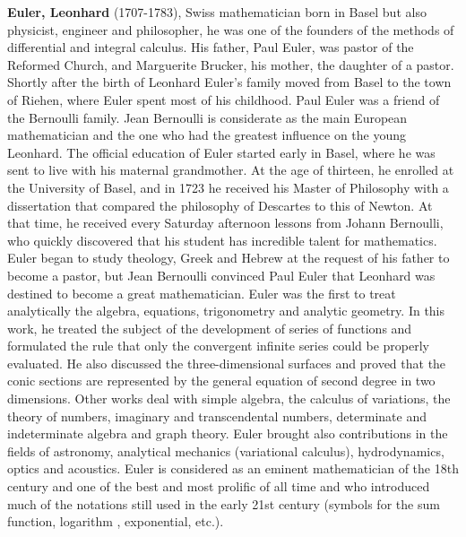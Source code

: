 \textbf{Euler, Leonhard} (1707-1783), Swiss mathematician born in Basel but also physicist, engineer and philosopher, he was one of the founders of the methods of differential and integral calculus.  His father, Paul Euler, was pastor of the Reformed Church, and Marguerite Brucker, his mother, the daughter of a pastor. Shortly after the birth of Leonhard Euler's family moved from Basel to the town of Riehen, where Euler spent most of his childhood. Paul Euler was a friend of the Bernoulli family. Jean Bernoulli is considerate as the main European mathematician and the one who had the greatest influence on the young Leonhard. The official education of Euler started early in Basel, where he was sent to live with his maternal grandmother. At the age of thirteen, he enrolled at the University of Basel, and in 1723 he received his Master of Philosophy with a dissertation that compared the philosophy of Descartes to this of Newton. At that time, he received every Saturday afternoon lessons from Johann Bernoulli, who quickly discovered that his student has incredible talent for mathematics. Euler began to study theology, Greek and Hebrew at the request of his father to become a pastor, but Jean Bernoulli convinced Paul Euler that Leonhard was destined to become a great mathematician. Euler was the first to treat analytically the algebra, equations, trigonometry and analytic geometry. In this work, he treated the subject of the development of series of functions and formulated the rule that only the convergent infinite series could be properly evaluated. He also discussed the three-dimensional surfaces and proved that the conic sections are represented by the general equation of second degree in two dimensions. Other works deal with simple algebra, the calculus of variations, the theory of numbers, imaginary and transcendental numbers, determinate and indeterminate algebra and graph theory. Euler brought also contributions in the fields of astronomy, analytical mechanics (variational calculus), hydrodynamics, optics and acoustics. Euler is considered as an eminent mathematician of the 18th century and one of the best and most prolific of all time and who introduced much of the notations still used in the early 21st century (symbols for the sum function, logarithm , exponential, etc.).

{}
\label{sec:F}


